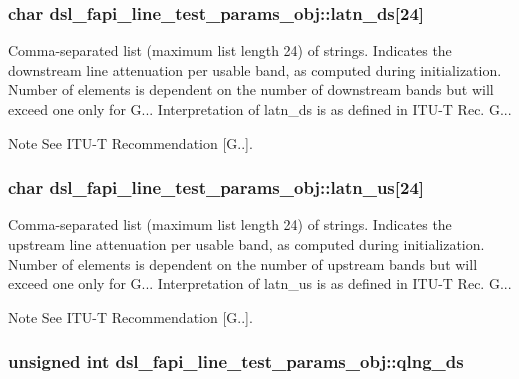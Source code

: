 \hypertarget{structdsl__fapi__line__test__params__obj_a35ceece146111cad9955e33a28c721ec}{
\subsubsection[{latn\-\_\-ds}]{\setlength{\rightskip}{0pt plus 5cm}char dsl\-\_\-fapi\-\_\-line\-\_\-test\-\_\-params\-\_\-obj\-::latn\-\_\-ds\mbox{[}24\mbox{]}}}\label{structdsl__fapi__line__test__params__obj_a35ceece146111cad9955e33a28c721ec}
Comma-\/separated list (maximum list length 24) of strings. Indicates the downstream line attenuation per usable band, as computed during initialization. Number of elements is dependent on the number of downstream bands but will exceed one only for G... Interpretation of latn\-\_\-ds is as defined in I\-T\-U-\/\-T Rec. G... \begin{DoxyNote}{Note}
See I\-T\-U-\/\-T Recommendation \mbox{[}G..\mbox{]}. 
\end{DoxyNote}
\hypertarget{structdsl__fapi__line__test__params__obj_a1c23bf6bcf03cfbe5fe720fa3d471742}{
\subsubsection[{latn\-\_\-us}]{\setlength{\rightskip}{0pt plus 5cm}char dsl\-\_\-fapi\-\_\-line\-\_\-test\-\_\-params\-\_\-obj\-::latn\-\_\-us\mbox{[}24\mbox{]}}}\label{structdsl__fapi__line__test__params__obj_a1c23bf6bcf03cfbe5fe720fa3d471742}
Comma-\/separated list (maximum list length 24) of strings. Indicates the upstream line attenuation per usable band, as computed during initialization. Number of elements is dependent on the number of upstream bands but will exceed one only for G... Interpretation of latn\-\_\-us is as defined in I\-T\-U-\/\-T Rec. G... \begin{DoxyNote}{Note}
See I\-T\-U-\/\-T Recommendation \mbox{[}G..\mbox{]}. 
\end{DoxyNote}
\hypertarget{structdsl__fapi__line__test__params__obj_a365fb061aee0314c538b0158145bcc46}{
\subsubsection[{qlng\-\_\-ds}]{\setlength{\rightskip}{0pt plus 5cm}unsigned int dsl\-\_\-fapi\-\_\-line\-\_\-test\-\_\-params\-\_\-obj\-::qlng\-\_\-ds}}\label{structdsl__fapi__line__test__params__obj_a365fb061aee0314c538b0158145bcc46}
